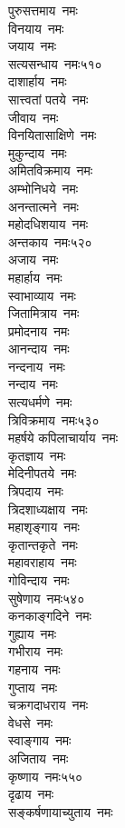 \begin{multicols}{\maxColumns}
\begin{flushleft}
पुरुसत्तमाय~नमः\\
विनयाय~नमः\\
जयाय~नमः\\
सत्यसन्धाय~नमः\hfill ५१०\\
दाशार्हाय~नमः\\
सात्त्वतां पतये~नमः\\
जीवाय~नमः\\
विनयितासाक्षिणे~नमः\\
मुकुन्दाय~नमः\\
अमितविक्रमाय~नमः\\
अम्भोनिधये~नमः\\
अनन्तात्मने~नमः\\
महोदधिशयाय~नमः\\
अन्तकाय~नमः\hfill ५२०\\
अजाय~नमः\\
महार्हाय~नमः\\
स्वाभाव्याय~नमः\\
जितामित्राय~नमः\\
प्रमोदनाय~नमः\\
आनन्दाय~नमः\\
नन्दनाय~नमः\\
नन्दाय~नमः\\
सत्यधर्मणे~नमः\\
त्रिविक्रमाय~नमः\hfill ५३०\\
महर्षये कपिलाचार्याय~नमः\\
कृतज्ञाय~नमः\\
मेदिनीपतये~नमः\\
त्रिपदाय~नमः\\
त्रिदशाध्यक्षाय~नमः\\
महाशृङ्गाय~नमः\\
कृतान्तकृते~नमः\\
महावराहाय~नमः\\
गोविन्दाय~नमः\\
सुषेणाय~नमः\hfill ५४०\\
कनकाङ्गदिने~नमः\\
गुह्याय~नमः\\
गभीराय~नमः\\
गहनाय~नमः\\
गुप्ताय~नमः\\
चक्रगदाधराय~नमः\\
वेधसे~नमः\\
स्वाङ्गाय~नमः\\
अजिताय~नमः\\
कृष्णाय~नमः\hfill ५५०\\
दृढाय~नमः\\
सङ्कर्षणायाच्युताय~नमः\\

\end{flushleft}
\end{multicols}

